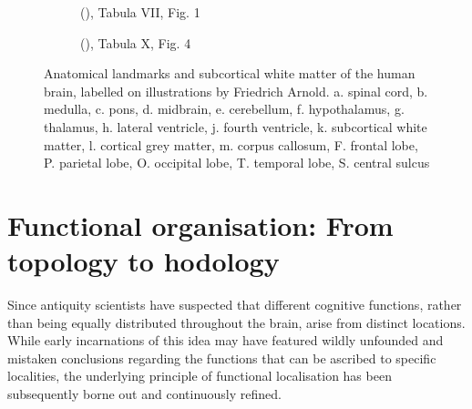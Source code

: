 \documentclass[12pt,phd,a4paper,twoside]{ucl_thesis}
\begin{document}
\begin{figure}[h!]
  \begin{subfigure}[b]{0.5\textwidth}
    
    \caption{\citeauthor{Arnold1838} (\citeyear{Arnold1838})\autocite{Arnold1838}, Tabula VII, Fig. 1}\label{fig:ardnoldVII1}
  \end{subfigure}\begin{subfigure}[b]{0.5\textwidth}
    
    \caption{\citeauthor{Arnold1838} (\citeyear{Arnold1838})\autocite{Arnold1838}, Tabula X, Fig. 4}\label{fig:ardnoldX4}
  \end{subfigure}
  \caption[Anatomical landmarks and subcortical white matter of the human brain]{Anatomical landmarks and subcortical white matter of the human brain, labelled on illustrations by Friedrich Arnold\autocite{Arnold1838}. a. spinal cord, b. medulla, c. pons, d. midbrain, e. cerebellum, f. hypothalamus, g. thalamus, h. lateral ventricle, j. fourth ventricle, k. subcortical white matter, l. cortical grey matter, m. corpus callosum, F. frontal lobe, P. parietal lobe, O. occipital lobe, T. temporal lobe, S. central sulcus}
  \label{fig:anat2}
\end{figure}


\section{Functional organisation: From topology to hodology}\label{sec:hodology}

Since antiquity scientists have suspected that different cognitive functions, rather than being equally distributed throughout the brain, arise from distinct locations.
While early incarnations of this idea may have featured wildly unfounded and mistaken conclusions regarding the functions that can be ascribed to specific localities, the underlying principle of functional localisation has been subsequently borne out and continuously refined.
\end{document}
